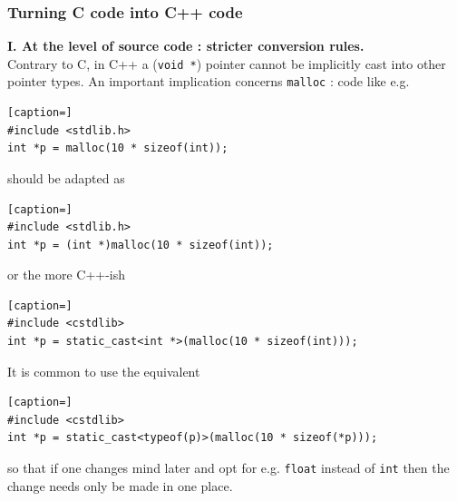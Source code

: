 \documentclass[8pt]{beamer}
\begin{document}
\begin{frame}[containsverbatim]
\frametitle{Turning C code into C++ code}

{\bf I. At the level of source code : stricter conversion rules.} \\[3pt]
Contrary to C, in C++ a ({\tt void *}) pointer cannot be 
implicitly cast into other pointer types. 
An important implication concerns {\tt malloc} : code like e.g.
\begin{lstlisting}[caption=]
#include <stdlib.h>
int *p = malloc(10 * sizeof(int));
\end{lstlisting}
should be adapted as
\begin{lstlisting}[caption=]
#include <stdlib.h>
int *p = (int *)malloc(10 * sizeof(int));
\end{lstlisting}
or the more C++-ish
\begin{lstlisting}[caption=]
#include <cstdlib>
int *p = static_cast<int *>(malloc(10 * sizeof(int)));
\end{lstlisting}
It is common to use the equivalent
\begin{lstlisting}[caption=]
#include <cstdlib>
int *p = static_cast<typeof(p)>(malloc(10 * sizeof(*p)));
\end{lstlisting}
so that if one changes mind later and opt for e.g. {\tt float} instead of {\tt int} then 
the change needs only be made in one place.
\end{frame}
\end{document}
